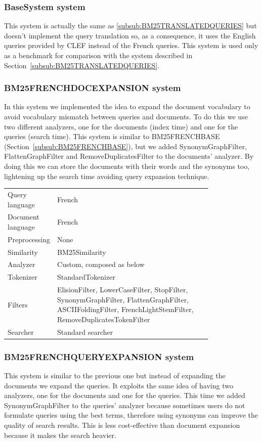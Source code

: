 \subsubsection{BaseSystem system}
\label{subsub:BaseSystem}
This system is actually the same as \ref{subsub:BM25TRANSLATEDQUERIES} but doesn't implement the query translation so, as a consequence, it uses the English queries provided by CLEF instead of the French queries. This system is used only as a benchmark for comparison with the system described in Section~\ref{subsub:BM25TRANSLATEDQUERIES}.

\subsubsection{BM25FRENCHDOCEXPANSION system}
\label{subsubsec:BM25FRENCHDOCEXPANSION}
In this system we implemented the idea to expand the document vocabulary to avoid vocabulary mismatch between queries and documents. To do this we use two different analyzers, one for the documents (index time) and one for the queries (search time). This system is similar to BM25FRENCHBASE (Section~\ref{subsub:BM25FRENCHBASE}), but we added SynonymGraphFilter, FlattenGraphFilter and RemoveDuplicatesFilter to the documents' analyzer. By doing this we can store the documents with their words and the synonyms too, lightening up the search time avoiding query expansion technique.

\begin{table}[h!]
    \centering
    \begin{tabular}{l p{0.8\linewidth}}
    Query language & French\\
    Document language & French\\
    Preprocessing & None\\
    Similarity & BM25Similarity\\
    Analyzer & Custom, composed as below\\
    Tokenizer & StandardTokenizer\\
    Filters & ElisionFilter, LowerCaseFilter, StopFilter, SynonymGraphFilter, FlattenGraphFilter, ASCIIFoldingFilter, FrenchLightStemFilter, RemoveDuplicatesTokenFilter\\
    Searcher & Standard searcher
    \end{tabular}
\end{table}

\subsubsection{BM25FRENCHQUERYEXPANSION system}
\label{subsubsec:BM25FRENCHQUERYEXPANSION}
This system is similar to the previous one but instead of expanding the documents we expand the queries. It exploits the same idea of having two analyzers, one for the documents and one for the queries. This time we added SynonymGraphFilter to the queries' analyzer because sometimes users do not formulate queries using the best terms, therefore using synonyms can improve the quality of search results. This is less cost-effective than document expansion because it makes the search heavier.

